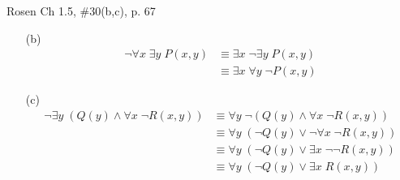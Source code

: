 \documentclass[10pt,addpoints]{exam}
\begin{document}
\begin{questions}
\question[4] Rosen Ch 1.5, \#30(b,c), p. 67
    \ifprintanswers
        \vspace{-10pt}
    \fi
\begin{solution}
    \begin{itemize}[itemsep=0pt,parsep=0pt,topsep=0pt,partopsep=0pt]
       \item[(b)]
       \vspace{-10pt}
       \begin{align*}
         \neg \forall x\; \exists y\; P(x,y) & \equiv \exists x\; \neg \exists y\; P(x,y) \\
         & \equiv \exists x\; \forall y\; \neg P(x,y)
       \end{align*}
        \item[(c)]
        \vspace{-25pt}
        \begin{align*}
          \neg \exists y\; (Q(y) \wedge \forall x\; \neg R(x,y)) & \equiv \forall y\; \neg(Q(y) \wedge \forall x\; \neg R(x,y)) \\
          & \equiv \forall y\; (\neg Q(y) \vee \neg \forall x\; \neg R(x,y)) \\
          & \equiv \forall y\; (\neg Q(y) \vee \exists x\; \neg \neg R(x,y))\\
          & \equiv \forall y\; (\neg Q(y) \vee \exists x\; R(x,y))
        \end{align*}

\end{itemize}
\end{solution}
\end{questions}
\end{document}
